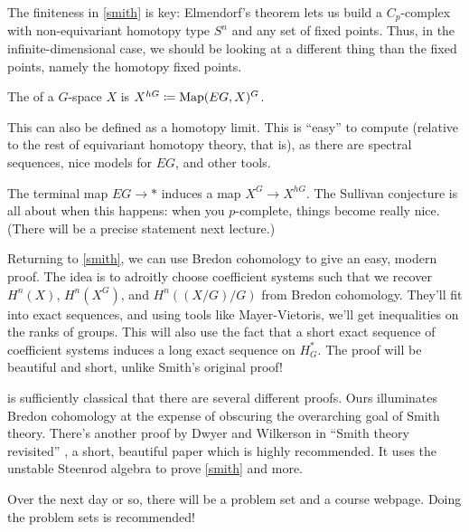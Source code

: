 The finiteness in \cref{smith} is key: Elmendorf's theorem lets us build a $C_p$-complex with non-equivariant
homotopy type $S^n$ and any set of fixed points. Thus, in the infinite-dimensional case, we should be looking at a
different thing than the fixed points, namely the homotopy fixed points.
\begin{defn}
The  of a $G$-space $X$ is $X^{hG}\coloneqq \operatorname{Map}(EG, X)^G$.
\end{defn}
This can also be defined as a homotopy limit. This is ``easy'' to compute (relative to the rest of equivariant
homotopy theory, that is), as there are spectral sequences, nice models for $EG$, and other tools.

The terminal map $EG\to *$ induces a map $X^G\to X^{hG}$. The Sullivan conjecture is all about when this happens:
when you $p$-complete, things become really nice. (There will be a precise statement next lecture.)

Returning to \cref{smith}, we can use Bredon cohomology to give an easy, modern proof. The idea is to adroitly
choose coefficient systems such that we recover $H^n(X)$, $H^n(X^G)$, and $H^n((X/G)/G)$ from Bredon cohomology.
They'll fit into exact sequences, and using tools like Mayer-Vietoris, we'll get inequalities on the ranks of
groups. This will also use the fact that a short exact sequence of coefficient systems induces a long exact
sequence on $H_G^*$. The proof will be beautiful and short, unlike Smith's original proof!

 is sufficiently classical that there are several different proofs. Ours illuminates Bredon cohomology
at the expense of obscuring the overarching goal of Smith theory. There's another proof by Dwyer and Wilkerson in
``Smith theory revisited'' \cite{SmithRevisit}, a short, beautiful paper which is highly recommended. It uses the
unstable Steenrod algebra to prove \cref{smith} and more.

Over the next day or so, there will be a problem set and a course webpage. Doing the problem sets is recommended!
